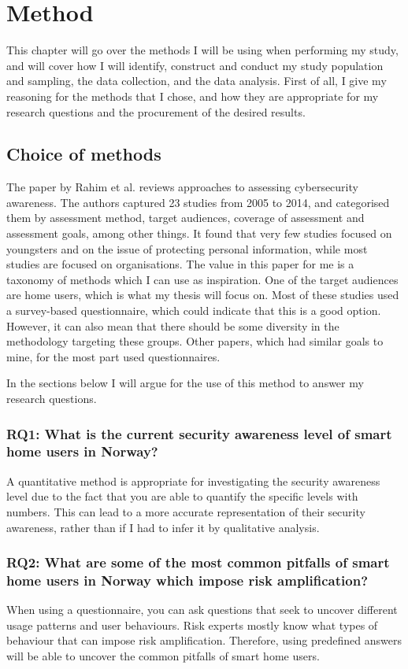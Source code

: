 \chapter{Method}
\label{chap:method}
This chapter will go over the methods I will be using when performing my study, and will cover how I will identify, construct and conduct my study population and sampling, the data collection, and the data analysis. First of all, I give my reasoning for the methods that I chose, and how they are appropriate for my research questions and the procurement of the desired results. 

\section{Choice of methods}
The paper by Rahim et al. \cite{rahim_et_al} reviews approaches to assessing cybersecurity awareness. The authors captured 23 studies from 2005 to 2014, and categorised them by assessment method, target audiences, coverage of assessment and assessment goals, among other things. It found that very few studies focused on youngsters and on the issue of protecting personal information, while most studies are focused on organisations. The value in this paper for me is a taxonomy of methods which I can use as inspiration. One of the target audiences are home users, which is what my thesis will focus on. Most of these studies used a survey-based questionnaire, which could indicate that this is a good option. However, it can also mean that there should be some diversity in the methodology targeting these groups. Other papers, which had similar goals to mine, for the most part used questionnaires. 

In the sections below I will argue for the use of this method to answer my research questions. 

\subsection*{RQ1: What is the current security awareness level of smart home users in Norway?}
A quantitative method is appropriate for investigating the security awareness level due to the fact that you are able to quantify the specific levels with numbers. This can lead to a more accurate representation of their security awareness, rather than if I had to infer it by qualitative analysis. 

\subsection*{RQ2: What are some of the most common pitfalls of smart home users in Norway which impose risk amplification?}
When using a questionnaire, you can ask questions that seek to uncover different usage patterns and user behaviours. Risk experts mostly know what types of behaviour that can impose risk amplification. Therefore, using predefined answers will be able to uncover the common pitfalls of smart home users. 

